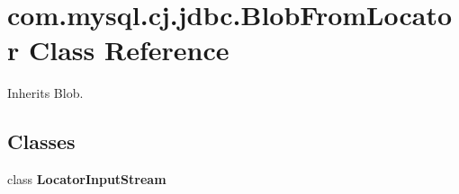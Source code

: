 \hypertarget{classcom_1_1mysql_1_1cj_1_1jdbc_1_1_blob_from_locator}{}\section{com.\+mysql.\+cj.\+jdbc.\+Blob\+From\+Locator Class Reference}
\label{classcom_1_1mysql_1_1cj_1_1jdbc_1_1_blob_from_locator}


Inherits Blob.

\subsection*{Classes}
\begin{DoxyCompactItemize}
\item 
class {\bfseries Locator\+Input\+Stream}
\end{DoxyCompactItemize}
